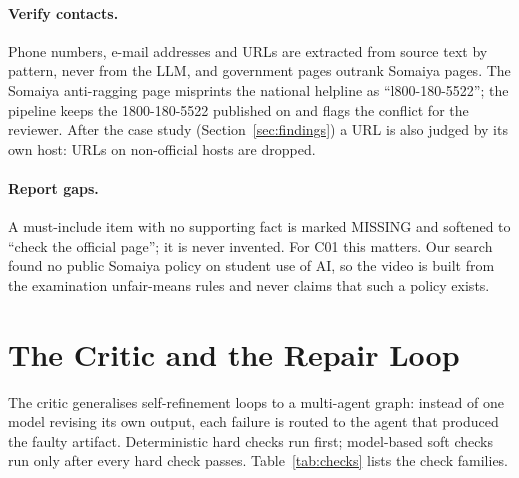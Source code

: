 \documentclass[twoside,11pt]{article}
\begin{document}
\paragraph{Verify contacts.} Phone numbers, e-mail addresses and URLs are extracted from source text by pattern, never from the LLM, and government pages outrank Somaiya pages. The Somaiya anti-ragging page misprints the national helpline as ``l800-180-5522''; the pipeline keeps the 1800-180-5522 published on  and flags the conflict for the reviewer. After the case study (Section~\ref{sec:findings}) a URL is also judged by its own host: URLs on non-official hosts are dropped.

\paragraph{Report gaps.} A must-include item with no supporting fact is marked MISSING and softened to ``check the official page''; it is never invented. For C01 this matters. Our search found no public Somaiya policy on student use of AI, so the video is built from the examination unfair-means rules and never claims that such a policy exists.

\section{The Critic and the Repair Loop}
\label{sec:critic}

The critic generalises self-refinement loops \citep{madaan2023selfrefine,shinn2023reflexion} to a multi-agent graph: instead of one model revising its own output, each failure is routed to the agent that produced the faulty artifact. Deterministic hard checks run first; model-based soft checks run only after every hard check passes. Table~\ref{tab:checks} lists the check families.
\end{document}
